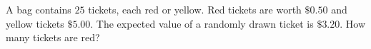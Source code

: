 A bag contains $25$ tickets, each red or yellow. Red tickets are worth $\$0.50$ and yellow tickets $\$5.00$. The expected value of a randomly drawn ticket is $\$3.20$. How many tickets are red?
